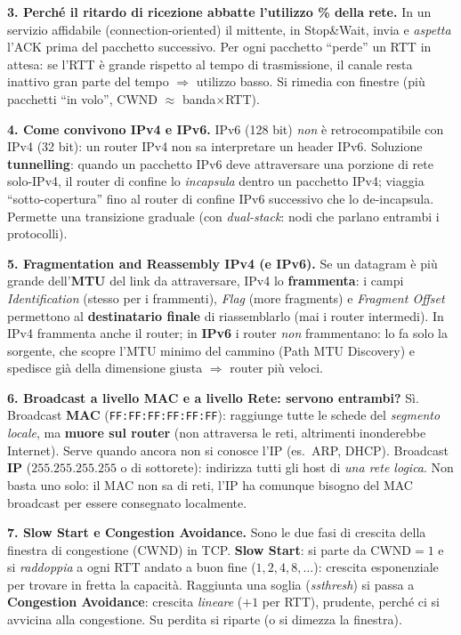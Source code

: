 \documentclass[11pt,a4paper]{report}
\begin{document}
\textbf{3. Perché il ritardo di ricezione abbatte l'utilizzo \% della rete.} In
un servizio affidabile (connection-oriented) il mittente, in Stop\&Wait, invia e
\emph{aspetta} l'ACK prima del pacchetto successivo. Per ogni pacchetto ``perde''
un RTT in attesa: se l'RTT è grande rispetto al tempo di trasmissione, il canale
resta inattivo gran parte del tempo $\Rightarrow$ utilizzo basso. Si rimedia con
finestre (più pacchetti ``in volo'', CWND $\approx$ banda$\times$RTT).

\textbf{4. Come convivono IPv4 e IPv6.} IPv6 (128 bit) \emph{non} è
retrocompatibile con IPv4 (32 bit): un router IPv4 non sa interpretare un header
IPv6. Soluzione \textbf{tunnelling}: quando un pacchetto IPv6 deve attraversare
una porzione di rete solo-IPv4, il router di confine lo \emph{incapsula} dentro un
pacchetto IPv4; viaggia ``sotto-copertura'' fino al router di confine IPv6
successivo che lo de-incapsula. Permette una transizione graduale (con
\emph{dual-stack}: nodi che parlano entrambi i protocolli).

\textbf{5. Fragmentation and Reassembly IPv4 (e IPv6).} Se un datagram è più
grande dell'\textbf{MTU} del link da attraversare, IPv4 lo \textbf{frammenta}: i
campi \emph{Identification} (stesso per i frammenti), \emph{Flag} (more
fragments) e \emph{Fragment Offset} permettono al \textbf{destinatario finale} di
riassemblarlo (mai i router intermedi). In IPv4 frammenta anche il router; in
\textbf{IPv6} i router \emph{non} frammentano: lo fa solo la sorgente, che scopre
l'MTU minimo del cammino (Path MTU Discovery) e spedisce già della dimensione
giusta $\Rightarrow$ router più veloci.

\textbf{6. Broadcast a livello MAC e a livello Rete: servono entrambi?} Sì.
Broadcast \textbf{MAC} (\texttt{FF:FF:FF:FF:FF:FF}): raggiunge tutte le schede del
\emph{segmento locale}, ma \textbf{muore sul router} (non attraversa le reti,
altrimenti inonderebbe Internet). Serve quando ancora non si conosce l'IP (es.\
ARP, DHCP). Broadcast \textbf{IP} ($255.255.255.255$ o di sottorete): indirizza
tutti gli host di \emph{una rete logica}. Non basta uno solo: il MAC non sa di
reti, l'IP ha comunque bisogno del MAC broadcast per essere consegnato localmente.

\textbf{7. Slow Start e Congestion Avoidance.} Sono le due fasi di crescita della
finestra di congestione (CWND) in TCP. \textbf{Slow Start}: si parte da CWND$=1$ e
si \emph{raddoppia} a ogni RTT andato a buon fine ($1,2,4,8,\dots$): crescita
esponenziale per trovare in fretta la capacità. Raggiunta una soglia
(\emph{ssthresh}) si passa a \textbf{Congestion Avoidance}: crescita
\emph{lineare} ($+1$ per RTT), prudente, perché ci si avvicina alla congestione.
Su perdita si riparte (o si dimezza la finestra).
\end{document}
